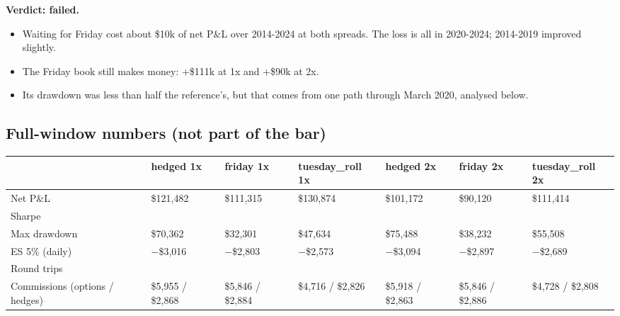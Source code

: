 \documentclass{article}
\begin{document}
\textbf{Verdict: failed.}

\begin{itemize}

\item Waiting for Friday cost about \$10k of net P\&L over 2014-2024 at both spreads. The loss is all in 2020-2024; 2014-2019 improved slightly.

\item The Friday book still makes money: +\$111k at 1x and +\$90k at 2x.

\item Its drawdown was less than half the reference's, but that comes from one path through March 2020, analysed below.

\end{itemize}

\subsection{Full-window numbers (not part of the bar)}

\begin{center}\small
\begin{tabularx}{\linewidth}{>{\raggedright\arraybackslash}X >{\raggedright\arraybackslash}X >{\raggedright\arraybackslash}X >{\raggedright\arraybackslash}X >{\raggedright\arraybackslash}X >{\raggedright\arraybackslash}X >{\raggedright\arraybackslash}X}
\toprule
\textbf{} & \textbf{hedged 1x} & \textbf{friday 1x} & \textbf{tuesday\_roll 1x} & \textbf{hedged 2x} & \textbf{friday 2x} & \textbf{tuesday\_roll 2x} \\
\midrule
Net P\&L & \$121,482 & \$111,315 & \$130,874 & \$101,172 & \$90,120 & \$111,414 \\
Sharpe & 0.52 & 0.57 & 0.72 & 0.43 & 0.45 & 0.60 \\
Max drawdown & \$70,362 & \$32,301 & \$47,634 & \$75,488 & \$38,232 & \$55,508 \\
ES 5\% (daily) & \ensuremath{-}\$3,016 & \ensuremath{-}\$2,803 & \ensuremath{-}\$2,573 & \ensuremath{-}\$3,094 & \ensuremath{-}\$2,897 & \ensuremath{-}\$2,689 \\
Round trips & 182 & 180 & 145 & 181 & 180 & 145 \\
Commissions (options /\allowbreak{} hedges) & \$5,955 /\allowbreak{} \$2,868 & \$5,846 /\allowbreak{} \$2,884 & \$4,716 /\allowbreak{} \$2,826 & \$5,918 /\allowbreak{} \$2,863 & \$5,846 /\allowbreak{} \$2,886 & \$4,728 /\allowbreak{} \$2,808 \\
\bottomrule
\end{tabularx}
\end{center}
\end{document}
